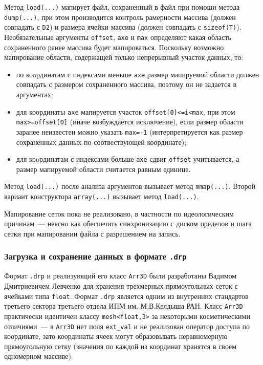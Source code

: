 Метод {\tt load(...)} мапирует файл, сохраненный в файл при помощи метода {\tt
dump(...)}, при этом производится контроль рамерности массива (должен
совпадать с {\tt D2}) и размера ячейки
массива (должен совпадать с {\tt sizeof(T)}). Необязательные аргументы {\tt offset}, {\tt axe} и {\tt max} определяют какая
область сохраненного ранее массива будет мапироваться. Поскольку возможно 
мапирование области, содержащей только непрерывный участок данных, то:
\begin{itemize}
\item по коoрдинатам с индексами меньше {\tt axe} размер мапируемой области должен
совпадать с размером сохраненного массива, поэтому он не задается в аргументах;
\item для координаты {\tt axe}
мапируется участок {\tt offset[0]<=i<max}, при этом {\tt max>=offset[0]}
(иначе возбуждается исключение), если
размер области заранее неизвестен можно указать {\tt max=-1} (интерпретируется как
размер сохраненных данных по соотвествующей координате);
\item для коoрдинатам с индексами больше {\tt axe} сдвиг {\tt offset}
  учитывается, а размер мапируемой области считается равным единице.
\end{itemize}
Метод {\tt load(...)} после анализа аргументов вызывает метод {\tt mmap(...)}.
Второй вариант конструктора {\tt array(...)} вызывает метод {\tt load(...)}.

Мапирование сеток пока не реализовано, в частности по идеологическим
причинам~--- неясно как обеспечить синхронизацию с диском пределов и шага
сетки при мапировании
файла с разрешением на запись.


\subsubsection{Загрузка и сохранение данных в формате {\tt .drp}}
Формат {\tt .drp} и реализующий его класс {\tt Arr3D} были разработаны Вадимом Дмитриевичем Левченко для хранения
трехмерных прямоугольных сеток с ячейками типа {\tt float}. Формат {\tt .drp} является одним из
внутренних стандартов третьего сектора третьего отдела ИПМ им. М.В.Келдыша
РАН. Класс {\tt Arr3D} практически идентичен классу {\tt mesh<float,3>} за
некоторыми косметическими отличиями~--- в {\tt Arr3D} нет поля {\tt ext\_val}
и не реализован оператор доступа по координате, зато координаты ячеек могут
образовывать неравномерную прямоугольную сетку (значения по каждой из координат
хранятся в своем одномерном массиве). 

